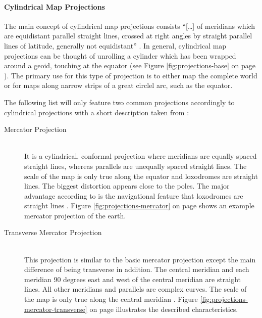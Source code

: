 \paragraph{Cylindrical Map Projections}
The main concept of cylindrical map projections consists ``[\ldots] of meridians which are equidistant parallel straight lines, crossed at right angles by straight parallel lines of latitude, generally not equidistant'' .
In general, cylindrical map projections can be thought of unrolling a cylinder which has been wrapped around a geoid, touching at the equator (see Figure \ref{fig:projections-base} on page \pageref{fig:projections-base}).
The primary use for this type of projection is to either map the complete world or for maps along narrow strips of a great circlel arc, such as the equator.

The following list will only feature two common projections accordingly to cylindrical projections with a short description taken from \citeauthor{Snyder1987} :

\begin{description}

\item[Mercator Projection] \hfill \\
It is a cylindrical, conformal projection where meridians are equally spaced straight lines, whereas parallels are unequally spaced straight lines. The scale of the map is only true along the equator and loxodromes are straight lines. The biggest distortion appears close to the poles. The major advantage according to \citeauthor{Snyder1987} is the navigational feature that loxodromes are straight lines . Figure \ref{fig:projections-mercator} on page \pageref{fig:projections-mercator} shows an example mercator projection of the earth.


\item[Transverse Mercator Projection] \hfill \\
This projection is similar to the basic mercator projection except the main difference of being transverse in addition. The central meridian and each meridian 90 degrees east and west of the central meridian are straight lines. All other meridians and parallels are complex curves. The scale of the map is only true along the central meridian . Figure \ref{fig:projections-mercator-transverse} on page \pageref{fig:projections-mercator-transverse} illustrates the described characteristics.

\end{description}

